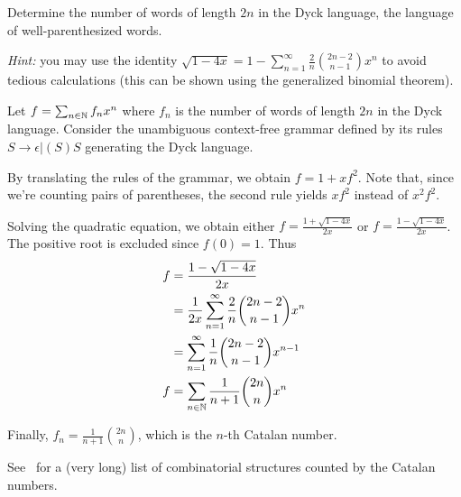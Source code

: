 \begin{exercise}\label{ex:catalan}
    Determine the number of words of length $2n$ in the Dyck
    language, \ie the language of well-parenthesized words.

    \emph{Hint:} you may use the identity $\sqrt{1 - 4x} = 1 -
    \sum_{n=1}^{\infty} \frac{2}{n} \binom{2n-2}{n-1} x^n$ to avoid
    tedious calculations (this can be shown using the generalized
    binomial theorem).
\end{exercise}
\begin{solution}
    Let $f = \sum_{n \in \mathbb N} f_n x^n$ where $f_n$ is the number of
    words of length $2n$ in the Dyck language.
    Consider the unambiguous context-free grammar defined by its
    rules $S \to \epsilon | (S)S$ generating the Dyck language.

    By translating the rules of the grammar, we obtain $f = 1 + x f^2$.
    Note that, since we're counting pairs of parentheses, the second
    rule yields $x f^2$ instead of $x^2 f^2$.

    Solving the quadratic equation, we obtain either $f = \frac{1 +
    \sqrt{1 - 4x}}{2x}$ or $f = \frac{1 - \sqrt{1 - 4x}}{2x}$.
    The positive root is excluded since $f(0) = 1$.
    Thus
    \begin{align*}
        f &= \frac{1 - \sqrt{1 - 4x}}{2x} \\
        &= \frac{1}{2x} \sum_{n=1}^{\infty} \frac{2}{n} \binom{2n-2}{n-1} x^n \\
        &= \sum_{n=1}^{\infty} \frac{1}{n} \binom{2n-2}{n-1} x^{n-1} \\
        f &= \sum_{n \in \mathbb N}\frac{1}{n+1} \binom{2n}{n} x^n
    \end{align*}

    Finally, $f_n = \frac{1}{n+1} \binom{2n}{n}$, which is the $n$-th
    Catalan number.

    See~\cite[Chapter 6]{Sta2023} for a (very long) list of combinatorial
    structures counted by the Catalan numbers.
\end{solution}

